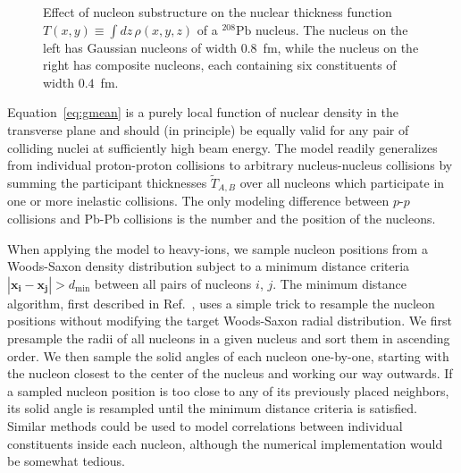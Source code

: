\documentclass[aps,prc,reprint,amsmath,nofootinbib]{revtex4-1}
\newcommand{\T}{\tilde{T}}
\begin{document}
\begin{figure}
  \caption{\label{fig:thickness} Effect of nucleon substructure on the nuclear thickness function $T(x, y) \equiv \int dz\, \rho(x, y, z)$ of a $^{208}\mathrm{Pb}$ nucleus. The nucleus on the left has Gaussian nucleons of width $0.8$~fm, while the nucleus on the right has composite nucleons, each containing six constituents of width $0.4$~fm.}
\end{figure}

Equation~\eqref{eq:gmean} is a purely local function of nuclear density in the transverse plane and should (in principle) be equally valid for any pair of colliding nuclei at sufficiently high beam energy.
The model readily generalizes from individual proton-proton collisions to arbitrary nucleus-nucleus collisions by summing the participant thicknesses $\T_{A,B}$ over all nucleons which participate in one or more inelastic collisions.
The only modeling difference between $p$-$p$ collisions and Pb-Pb collisions is the number and the position of the nucleons.

When applying the model to heavy-ions, we sample nucleon positions from a Woods-Saxon density distribution subject to a minimum distance criteria $|\mathbf{x_i} - \mathbf{x_j}| > d_\mathrm{min}$ between all pairs of nucleons $i$, $j$.
The minimum distance algorithm, first described in Ref.~\cite{Bernhard:2018hnz}, uses a simple trick to resample the nucleon positions without modifying the target Woods-Saxon radial distribution.
We first presample the radii of all nucleons in a given nucleus and sort them in ascending order.
We then sample the solid angles of each nucleon one-by-one, starting with the nucleon closest to the center of the nucleus and working our way outwards.
If a sampled nucleon position is too close to any of its previously placed neighbors, its solid angle is resampled until the minimum distance criteria is satisfied.
Similar methods could be used to model correlations between individual constituents inside each nucleon, although the numerical implementation would be somewhat tedious.
\end{document}
